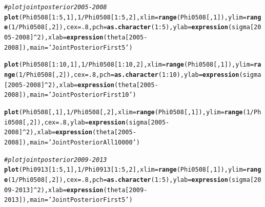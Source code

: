 \documentclass{article}\usepackage[]{graphicx}\usepackage[]{color}
\makeatletter
\newcommand{\hlnum}[1]{\textcolor[rgb]{0.686,0.059,0.569}{#1}}%
\newcommand{\hlstr}[1]{\textcolor[rgb]{0.192,0.494,0.8}{#1}}%
\newcommand{\hlcom}[1]{\textcolor[rgb]{0.678,0.584,0.686}{\textit{#1}}}%
\newcommand{\hlopt}[1]{\textcolor[rgb]{0,0,0}{#1}}%
\newcommand{\hlstd}[1]{\textcolor[rgb]{0.345,0.345,0.345}{#1}}%
\newcommand{\hlkwc}[1]{\textcolor[rgb]{0.333,0.667,0.333}{#1}}%
\newcommand{\hlkwd}[1]{\textcolor[rgb]{0.737,0.353,0.396}{\textbf{#1}}}%
\newenvironment{kframe}{%
 \def\at@end@of@kframe{}%
 \ifinner\ifhmode%
  \def\at@end@of@kframe{\end{minipage}}%
  \begin{minipage}{\columnwidth}%
 \fi\fi%
 \def\FrameCommand##1{\hskip\@totalleftmargin \hskip-\fboxsep
 \colorbox{shadecolor}{##1}\hskip-\fboxsep
     \hskip-\linewidth \hskip-\@totalleftmargin \hskip\columnwidth}%
 \MakeFramed {\advance\hsize-\width
   \@totalleftmargin\z@ \linewidth\hsize
   \@setminipage}}%
 {\par\unskip\endMakeFramed%
 \at@end@of@kframe}
\newenvironment{knitrout}{}{} %
\makeatother
\begin{document}
{\begin{enumerate}
\begin{enumerate}
\begin{knitrout}
\begin{kframe}
\begin{alltt}
\hlcom{# plot joint posterior 2005-2008}
\hlkwd{plot}\hlstd{(Phi0508[}\hlnum{1}\hlopt{:}\hlnum{5}\hlstd{,}\hlnum{1}\hlstd{],}\hlnum{1}\hlopt{/}\hlstd{Phi0508[}\hlnum{1}\hlopt{:}\hlnum{5}\hlstd{,}\hlnum{2}\hlstd{],}\hlkwc{xlim}\hlstd{=}\hlkwd{range}\hlstd{(Phi0508[,}\hlnum{1}\hlstd{]),}\hlkwc{ylim}\hlstd{=}\hlkwd{range}\hlstd{(}\hlnum{1}\hlopt{/}\hlstd{Phi0508[,}\hlnum{2}\hlstd{]),}\hlkwc{cex}\hlstd{=}\hlnum{.8}\hlstd{,}\hlkwc{pch}\hlstd{=}\hlkwd{as.character}\hlstd{(}\hlnum{1}\hlopt{:}\hlnum{5}\hlstd{),} \hlkwc{ylab}\hlstd{=}\hlkwd{expression}\hlstd{(sigma [}\hlnum{2005}\hlopt{-}\hlnum{2008}\hlstd{]}\hlopt{^}\hlnum{2}\hlstd{),} \hlkwc{xlab} \hlstd{=} \hlkwd{expression}\hlstd{(theta [}\hlnum{2005}\hlopt{-}\hlnum{2008}\hlstd{]),} \hlkwc{main}\hlstd{=}\hlstr{'Joint Posterior First 5'}\hlstd{)}

\hlkwd{plot}\hlstd{(Phi0508[}\hlnum{1}\hlopt{:}\hlnum{10}\hlstd{,}\hlnum{1}\hlstd{],}\hlnum{1}\hlopt{/}\hlstd{Phi0508[}\hlnum{1}\hlopt{:}\hlnum{10}\hlstd{,}\hlnum{2}\hlstd{],}\hlkwc{xlim}\hlstd{=}\hlkwd{range}\hlstd{(Phi0508[,}\hlnum{1}\hlstd{]),}\hlkwc{ylim}\hlstd{=}\hlkwd{range}\hlstd{(}\hlnum{1}\hlopt{/}\hlstd{Phi0508[,}\hlnum{2}\hlstd{]),}\hlkwc{cex}\hlstd{=}\hlnum{.8}\hlstd{,}\hlkwc{pch}\hlstd{=}\hlkwd{as.character}\hlstd{(}\hlnum{1}\hlopt{:}\hlnum{10}\hlstd{),} \hlkwc{ylab}\hlstd{=}\hlkwd{expression}\hlstd{(sigma [}\hlnum{2005}\hlopt{-}\hlnum{2008}\hlstd{]}\hlopt{^}\hlnum{2}\hlstd{),} \hlkwc{xlab} \hlstd{=} \hlkwd{expression}\hlstd{(theta [}\hlnum{2005}\hlopt{-}\hlnum{2008}\hlstd{]),} \hlkwc{main}\hlstd{=}\hlstr{'Joint Posterior First 10'}\hlstd{)}

\hlkwd{plot}\hlstd{(Phi0508[,}\hlnum{1}\hlstd{],}\hlnum{1}\hlopt{/}\hlstd{Phi0508[,}\hlnum{2}\hlstd{],}\hlkwc{xlim}\hlstd{=}\hlkwd{range}\hlstd{(Phi0508[,}\hlnum{1}\hlstd{]),}\hlkwc{ylim}\hlstd{=}\hlkwd{range}\hlstd{(}\hlnum{1}\hlopt{/}\hlstd{Phi0508[,}\hlnum{2}\hlstd{]),}\hlkwc{cex}\hlstd{=}\hlnum{.8}\hlstd{,} \hlkwc{ylab}\hlstd{=}\hlkwd{expression}\hlstd{(sigma [}\hlnum{2005}\hlopt{-}\hlnum{2008}\hlstd{]}\hlopt{^}\hlnum{2}\hlstd{),} \hlkwc{xlab} \hlstd{=} \hlkwd{expression}\hlstd{(theta [}\hlnum{2005}\hlopt{-}\hlnum{2008}\hlstd{]),} \hlkwc{main}\hlstd{=}\hlstr{'Joint Posterior All 10000'}\hlstd{)}


\hlcom{# plot joint posterior 2009-2013}
\hlkwd{plot}\hlstd{(Phi0913[}\hlnum{1}\hlopt{:}\hlnum{5}\hlstd{,}\hlnum{1}\hlstd{],}\hlnum{1}\hlopt{/}\hlstd{Phi0913[}\hlnum{1}\hlopt{:}\hlnum{5}\hlstd{,}\hlnum{2}\hlstd{],}\hlkwc{xlim}\hlstd{=}\hlkwd{range}\hlstd{(Phi0508[,}\hlnum{1}\hlstd{]),}\hlkwc{ylim}\hlstd{=}\hlkwd{range}\hlstd{(}\hlnum{1}\hlopt{/}\hlstd{Phi0508[,}\hlnum{2}\hlstd{]),}\hlkwc{cex}\hlstd{=}\hlnum{.8}\hlstd{,}\hlkwc{pch}\hlstd{=}\hlkwd{as.character}\hlstd{(}\hlnum{1}\hlopt{:}\hlnum{5}\hlstd{),} \hlkwc{ylab}\hlstd{=}\hlkwd{expression}\hlstd{(sigma [}\hlnum{2009}\hlopt{-}\hlnum{2013}\hlstd{]}\hlopt{^}\hlnum{2}\hlstd{),} \hlkwc{xlab} \hlstd{=} \hlkwd{expression}\hlstd{(theta [}\hlnum{2009}\hlopt{-}\hlnum{2013}\hlstd{]),} \hlkwc{main}\hlstd{=}\hlstr{'Joint Posterior First 5'}\hlstd{)}


\end{alltt}
\end{kframe}
\end{knitrout}
\end{enumerate}
\end{enumerate}}
\end{document}

